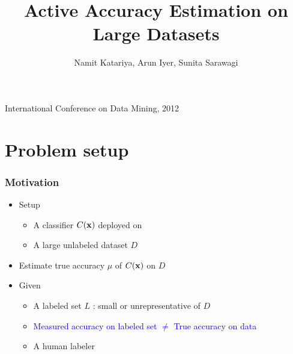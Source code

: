 \documentclass[usenames,dvipsnames, 11pt]{beamer}
\title[{\makebox[.45\paperwidth]{Active Evaluation of Classifiers\hfill%
       \insertframenumber/\inserttotalframenumber}}]{Active Accuracy Estimation on Large Datasets}
\author {Namit Katariya, Arun Iyer, Sunita Sarawagi}
\institute{IIT Bombay}
\newcommand{\vek}[1]{{\bf {#1}}}
\newcommand{\vx}{{\vek{x}}}
\newlength{\wideitemsep}
\let\olditem\item
\renewcommand{\item}{\setlength{\itemsep}{\wideitemsep}\olditem}
\begin{document}
\begin{frame}
\titlepage
\begin{center}
\large{International Conference on Data Mining, 2012} \\ \vspace*{10pt}
\end{center}
\end{frame}






\section{Problem setup}
\begin{frame}
\frametitle{Motivation}
\pause
\begin{itemize}
\item Setup
  \begin{itemize}
  \item A classifier $C(\vx)$ deployed on
  \item A large unlabeled dataset $D$
  \end{itemize}
  \pause
\item Estimate true accuracy $\mu$ of $C(\vx)$ on $D$
\pause
\item Given
  \begin{itemize}
\item A labeled set $L$ :  small or unrepresentative of $D$ 
\item \textcolor{blue}{Measured accuracy on labeled set $\neq$ True accuracy on data}
\item A human labeler
\end{itemize}
\end{itemize}
\end{frame}
\end{document}
